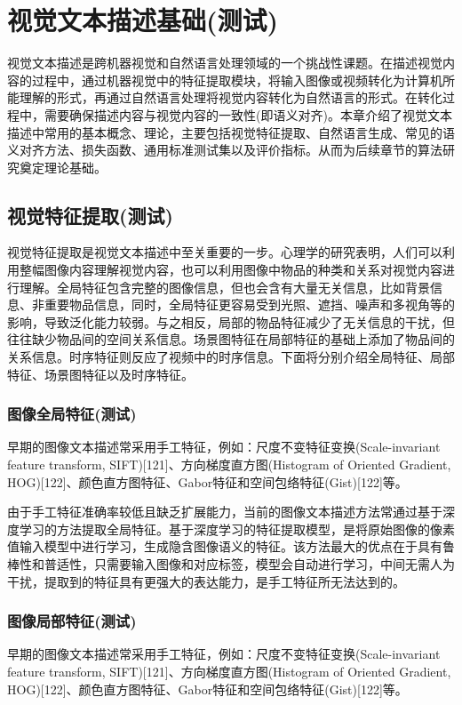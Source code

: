 
\chapter{视觉文本描述基础(测试)}
视觉文本描述是跨机器视觉和自然语言处理领域的一个挑战性课题。在描述视觉内容的过程中，通过机器视觉中的特征提取模块，将输入图像或视频转化为计算机所能理解的形式，再通过自然语言处理将视觉内容转化为自然语言的形式。在转化过程中，需要确保描述内容与视觉内容的一致性(即语义对齐)。本章介绍了视觉文本描述中常用的基本概念、理论，主要包括视觉特征提取、自然语言生成、常见的语义对齐方法、损失函数、通用标准测试集以及评价指标。从而为后续章节的算法研究奠定理论基础。

\section{视觉特征提取(测试)}
视觉特征提取是视觉文本描述中至关重要的一步。心理学的研究表明，人们可以利用整幅图像内容理解视觉内容，也可以利用图像中物品的种类和关系对视觉内容进行理解。全局特征包含完整的图像信息，但也会含有大量无关信息，比如背景信息、非重要物品信息，同时，全局特征更容易受到光照、遮挡、噪声和多视角等的影响，导致泛化能力较弱。与之相反，局部的物品特征减少了无关信息的干扰，但往往缺少物品间的空间关系信息。场景图特征在局部特征的基础上添加了物品间的关系信息。时序特征则反应了视频中的时序信息。下面将分别介绍全局特征、局部特征、场景图特征以及时序特征。

\subsection{图像全局特征(测试)}
早期的图像文本描述常采用手工特征，例如：尺度不变特征变换(Scale-invariant feature transform, SIFT)[121]、方向梯度直方图(Histogram of Oriented Gradient, HOG)[122]、颜色直方图特征、Gabor特征和空间包络特征(Gist)[122]等。

由于手工特征准确率较低且缺乏扩展能力，当前的图像文本描述方法常通过基于深度学习的方法提取全局特征。基于深度学习的特征提取模型，是将原始图像的像素值输入模型中进行学习，生成隐含图像语义的特征。该方法最大的优点在于具有鲁棒性和普适性，只需要输入图像和对应标签，模型会自动进行学习，中间无需人为干扰，提取到的特征具有更强大的表达能力，是手工特征所无法达到的。

\subsection{图像局部特征(测试)}
早期的图像文本描述常采用手工特征，例如：尺度不变特征变换(Scale-invariant feature transform, SIFT)[121]、方向梯度直方图(Histogram of Oriented Gradient, HOG)[122]、颜色直方图特征、Gabor特征和空间包络特征(Gist)[122]等。

